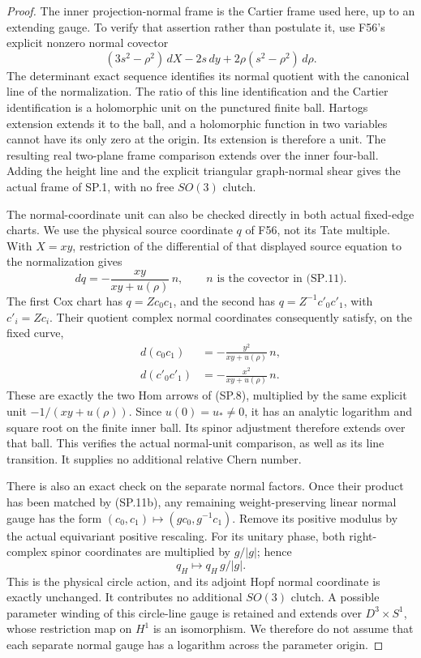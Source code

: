 \begin{proof}
The inner projection-normal frame is the Cartier frame used here,
up to an extending gauge. To verify that assertion rather than
postulate it, use F56's explicit nonzero normal covector
\[
       (3s^2-\rho^2)\,dX-2s\,dy
                          +2\rho(s^2-\rho^2)\,d\rho .     \tag{SP.11}
\]
The determinant exact sequence identifies its normal quotient with
the canonical line of the normalization. The ratio of this line
identification and the Cartier identification is a holomorphic unit
on the punctured finite ball. Hartogs extension extends it to the
ball, and a holomorphic function in two variables cannot have its
only zero at the origin. Its extension is therefore a unit. The
resulting real two-plane frame comparison extends over the inner
four-ball. Adding the height line and the explicit triangular
graph-normal shear gives the actual frame of SP.1, with no free
\(SO(3)\) clutch.

The normal-coordinate unit can also be checked directly in both
actual fixed-edge charts. We use the physical source coordinate
\(q\) of F56, not its Tate multiple. With \(X=xy\), restriction
of the differential of that displayed source equation to the
normalization gives
\[
 dq=-\frac{xy}{xy+u(\rho)}\,n,
 \qquad n\text{ is the covector in (SP.11)}.              \tag{SP.11a}
\]
The first Cox chart has \(q=Zc_0c_1\), and the second has
\(q=Z^{-1}c'_0c'_1\), with \(c'_i=Zc_i\). Their quotient
complex normal coordinates consequently satisfy, on the fixed curve,
\[
 \begin{aligned}
 d(c_0c_1)&=-\frac{y^2}{xy+u(\rho)}\,n,\\
 d(c'_0c'_1)&=-\frac{x^2}{xy+u(\rho)}\,n.
 \end{aligned}                                             \tag{SP.11b}
\]
These are exactly the two Hom arrows of (SP.8), multiplied by the
same explicit unit \(-1/(xy+u(\rho))\). Since \(u(0)=u_*\ne0\),
it has an analytic logarithm and square root on the finite inner
ball. Its spinor adjustment therefore extends over that ball. This
verifies the actual normal-unit comparison, as well as its line
transition. It supplies no additional relative Chern number.

There is also an exact check on the separate normal factors. Once
their product has been matched by (SP.11b), any remaining
weight-preserving linear normal gauge has the form
\((c_0,c_1)\mapsto(g c_0,g^{-1}c_1)\). Remove its positive
modulus by the actual equivariant positive rescaling. For its unitary
phase, both right-complex spinor coordinates are multiplied by
\(g/|g|\); hence
\[
                  q_H\longmapsto q_H\,g/|g|.             \tag{SP.11c}
\]
This is the physical circle action, and its adjoint Hopf normal
coordinate is exactly unchanged. It contributes no additional
\(SO(3)\) clutch. A possible parameter winding of this circle-line
gauge is retained and extends over \(D^3\times S^1\), whose
restriction map on \(H^1\) is an isomorphism. We therefore do not
assume that each separate normal gauge has a logarithm across the
parameter origin.


\end{proof}
